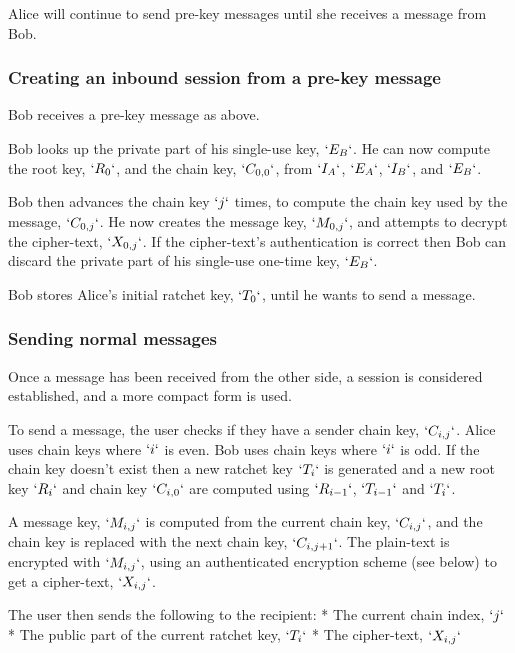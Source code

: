 \documentclass[10pt]{article}
\begin{document}
Alice will continue to send pre-key messages until she receives a
message from Bob.

\subsubsection{Creating an inbound session from a pre-key message}\label{creating-an-inbound-session-from-a-pre-key-message}

Bob receives a pre-key message as above.

Bob looks up the private part of his single-use key, \(`E_B`\). He can
now compute the root key, \(`R_0`\), and the chain key, \(`C_{0,0}`\),
from \(`I_A`\), \(`E_A`\), \(`I_B`\), and \(`E_B`\).

Bob then advances the chain key \(`j`\) times, to compute the chain key
used by the message, \(`C_{0,j}`\). He now creates the message key,
\(`M_{0,j}`\), and attempts to decrypt the cipher-text, \(`X_{0,j}`\).
If the cipher-text's authentication is correct then Bob can discard the
private part of his single-use one-time key, \(`E_B`\).

Bob stores Alice's initial ratchet key, \(`T_0`\), until he wants to
send a message.

\subsubsection{Sending normal messages}\label{sending-normal-messages}

Once a message has been received from the other side, a session is
considered established, and a more compact form is used.

To send a message, the user checks if they have a sender chain key,
\(`C_{i,j}`\). Alice uses chain keys where \(`i`\) is even. Bob uses
chain keys where \(`i`\) is odd. If the chain key doesn't exist then a
new ratchet key \(`T_i`\) is generated and a new root key \(`R_i`\) and
chain key \(`C_{i,0}`\) are computed using \(`R_{i-1}`\), \(`T_{i-1}`\)
and \(`T_i`\).

A message key, \(`M_{i,j}`\) is computed from the current chain key,
\(`C_{i,j}`\), and the chain key is replaced with the next chain key,
\(`C_{i,j+1}`\). The plain-text is encrypted with \(`M_{i,j}`\), using
an authenticated encryption scheme (see below) to get a cipher-text,
\(`X_{i,j}`\).

The user then sends the following to the recipient: * The current chain
index, \(`j`\) * The public part of the current ratchet key, \(`T_i`\) *
The cipher-text, \(`X_{i,j}`\)
\end{document}
